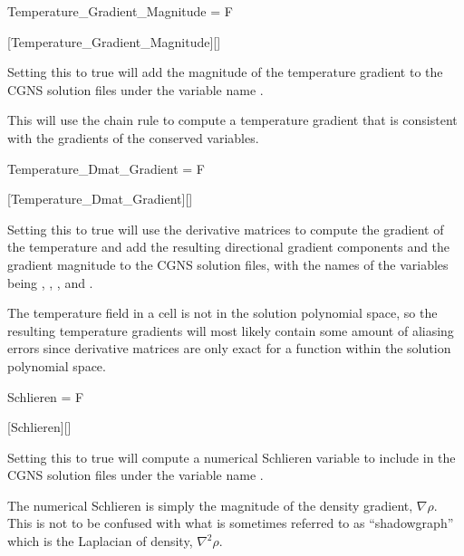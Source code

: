 
\begin{nmldescitem}
Temperature_Gradient_Magnitude = F
\end{nmldescitem}
[Temperature\_Gradient\_Magnitude][]

\begin{nmldescbody}
Setting this to true will add the magnitude of the temperature gradient
to the CGNS solution files under the variable name .

\noindent\NOTE
This will use the chain rule to compute a temperature gradient that is consistent
with the gradients of the conserved variables.
\end{nmldescbody}


\FINALFIX{\newpage}
\begin{nmldescitem}
Temperature_Dmat_Gradient = F
\end{nmldescitem}
[Temperature\_Dmat\_Gradient][]

\begin{nmldescbody}
Setting this to true will use the derivative matrices to compute the gradient of
the temperature and add the resulting directional gradient components and the
gradient magnitude to the CGNS solution files, with the names of the variables
being , ,
, and .

\noindent\NOTE
The temperature field in a cell is not in the solution polynomial space, so the
resulting temperature gradients will most likely contain some amount of aliasing
errors since derivative matrices are only exact for a function within the
solution polynomial space.
\end{nmldescbody}


\begin{nmldescitem}
Schlieren = F
\end{nmldescitem}
[Schlieren][]

\begin{nmldescbody}
Setting this to true will compute a numerical Schlieren variable to include
in the CGNS solution files under the variable name .

\noindent\NOTE
The numerical Schlieren is simply the magnitude of the density gradient, \thatis
$\nabla\rho$.
%
This is not to be confused with what is sometimes referred to as
``shadowgraph'' which is the Laplacian of density, \thatis $\nabla^2\rho$.
\end{nmldescbody}

